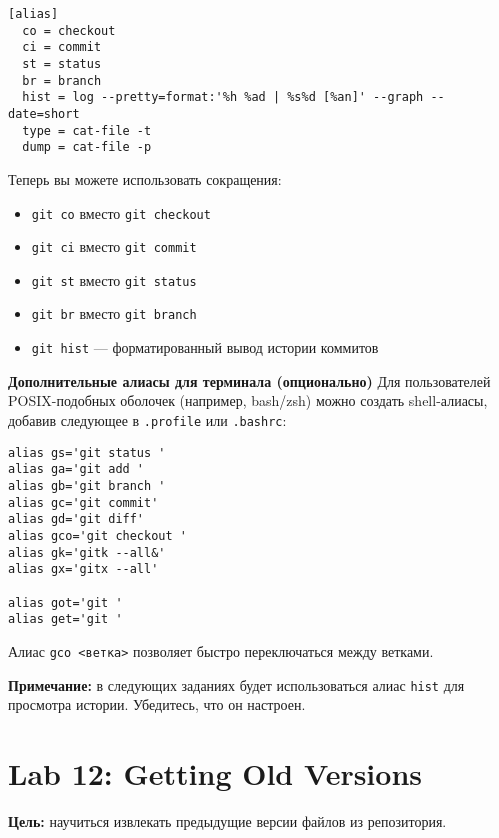 \documentclass[a4paper,12pt]{report}
\begin{document}
\begin{verbatim}
[alias]
  co = checkout
  ci = commit
  st = status
  br = branch
  hist = log --pretty=format:'%h %ad | %s%d [%an]' --graph --date=short
  type = cat-file -t
  dump = cat-file -p
\end{verbatim}

Теперь вы можете использовать сокращения:
\begin{itemize}
  \item \texttt{git co} вместо \texttt{git checkout}
  \item \texttt{git ci} вместо \texttt{git commit}
  \item \texttt{git st} вместо \texttt{git status}
  \item \texttt{git br} вместо \texttt{git branch}
  \item \texttt{git hist} — форматированный вывод истории коммитов
\end{itemize}


\textbf{Дополнительные алиасы для терминала (опционально)}
Для пользователей POSIX-подобных оболочек (например, bash/zsh) можно создать shell-алиасы, добавив следующее в \texttt{.profile} или \texttt{.bashrc}:

\begin{verbatim}
alias gs='git status '
alias ga='git add '
alias gb='git branch '
alias gc='git commit'
alias gd='git diff'
alias gco='git checkout '
alias gk='gitk --all&'
alias gx='gitx --all'

alias got='git '
alias get='git '
\end{verbatim}

Алиас \texttt{gco <ветка>} позволяет быстро переключаться между ветками.


\textbf{Примечание:} в следующих заданиях будет использоваться алиас \texttt{hist} для просмотра истории. Убедитесь, что он настроен.

\section{Lab 12: Getting Old Versions}
\textbf{Цель:} научиться извлекать предыдущие версии файлов из репозитория.
\end{document}
